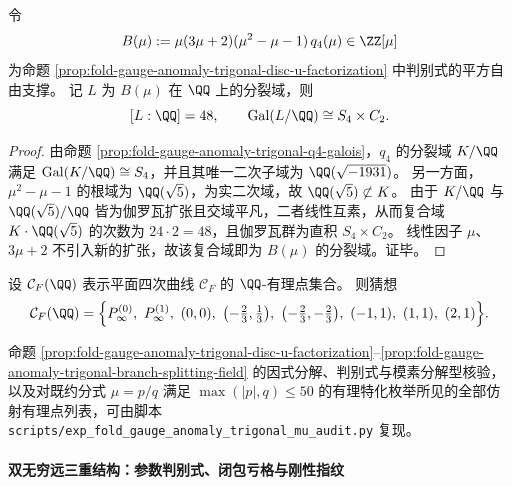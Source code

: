 \begin{proposition}\label{prop:fold-gauge-anomaly-trigonal-branch-splitting-field}
令
\[
B(\mu):=\mu(3\mu+2)(\mu^{2}-\mu-1)\,q_4(\mu)\in\ZZ[\mu]
\]
为命题 \ref{prop:fold-gauge-anomaly-trigonal-disc-u-factorization} 中判别式的平方自由支撑。
记 \(L\) 为 \(B(\mu)\) 在 \(\QQ\) 上的分裂域，则
\[
[L:\QQ]=48,\qquad \mathrm{Gal}(L/\QQ)\cong S_4\times C_2.
\]
\end{proposition}
\begin{proof}
由命题 \ref{prop:fold-gauge-anomaly-trigonal-q4-galois}，\(q_4\) 的分裂域 \(K/\QQ\) 满足 \(\mathrm{Gal}(K/\QQ)\cong S_4\)，并且其唯一二次子域为 \(\QQ(\sqrt{-1931})\)。
另一方面，\(\mu^{2}-\mu-1\) 的根域为 \(\QQ(\sqrt5)\)，为实二次域，故 \(\QQ(\sqrt5)\not\subset K\)。
由于 \(K/\QQ\) 与 \(\QQ(\sqrt5)/\QQ\) 皆为伽罗瓦扩张且交域平凡，二者线性互素，从而复合域 \(K\cdot\QQ(\sqrt5)\) 的次数为 \(24\cdot 2=48\)，且伽罗瓦群为直积 \(S_4\times C_2\)。
线性因子 \(\mu\)、\(3\mu+2\) 不引入新的扩张，故该复合域即为 \(B(\mu)\) 的分裂域。证毕。
\end{proof}

\begin{conjecture}[有理点的完备刻画]\label{conj:fold-gauge-anomaly-trigonal-rational-points}
设 \(\mathcal C_F(\QQ)\) 表示平面四次曲线 \(\mathcal C_F\) 的 \(\QQ\)-有理点集合。
则猜想
\[
\mathcal C_F(\QQ)=
\Bigl\{
P_\infty^{(0)},\ P_\infty^{(1)},\ (0,0),\ \bigl(-\tfrac23,\tfrac13\bigr),\ \bigl(-\tfrac23,-\tfrac23\bigr),\ (-1,1),\ (1,1),\ (2,1)
\Bigr\}.
\]
\end{conjecture}
\begin{remark}[计算证据接口]\label{rem:fold-gauge-anomaly-trigonal-mu-audit}
命题 \ref{prop:fold-gauge-anomaly-trigonal-disc-u-factorization}--\ref{prop:fold-gauge-anomaly-trigonal-branch-splitting-field} 的因式分解、判别式与模素分解型核验，以及对既约分式 \(\mu=p/q\) 满足 \(\max(|p|,q)\le 50\) 的有理特化枚举所见的全部仿射有理点列表，可由脚本 \texttt{scripts/exp\_fold\_gauge\_anomaly\_trigonal\_mu\_audit.py} 复现。
\end{remark}

\paragraph{双无穷远三重结构：参数判别式、闭包亏格与刚性指纹}

